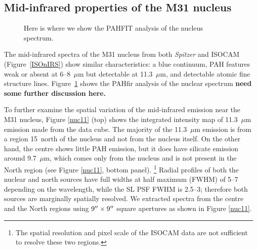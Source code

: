 \subsection{Mid-infrared properties of the M31 nucleus}
\label{sect:nucleus}

\begin{figure}
\centering
\caption{Here is where we show the PAHFIT analysis of the nucleus spectrum.}
\label{fig:nuc_pahfit}
\end{figure}

The mid-infrared spectra of the M31 nucleus from both {\em Spitzer} and ISOCAM (Figure~\ref{ISOnIRS}) show similar characteristics: a blue
continuum, PAH features weak or absent at 6--8~$\mu$m  but detectable at 11.3~$\mu$m, and detectable atomic fine structure lines.
Figure~\ref{fig:nuc_pahfit} shows the PAHfir analysis of the nuclear spectrum 
 {\bf need some further discussion  here.}


To further examine the spatial variation of the mid-infrared emission near the M31 nucleus,
Figure \ref{nuc11} (top) shows the integrated intensity map of 11.3~$\mu$m emission made from the data cube. 
The majority of the 11.3~$\mu$m  emission is from a region 15\arcsec\ north of the nucleus and not from the nucleus itself. 
On the other hand, the centre shows little PAH emission,  but it does have silicate emission around 9.7~$\mu$m, 
which comes only from the nucleus and is not present in the North region  (see Figure \ref{nuc11}, bottom panel).%
\footnote{The spatial resolution and pixel scale of the ISOCAM data are not sufficient to resolve these two regions.}
Radial profiles of both the nuclear and north sources have full widths at half maximum (FWHM) of 5--7\arcsec
depending on the wavelength, while the SL PSF FWHM is 2.5--3\arcsec; therefore both sources are
marginally spatially resolved.  %
We extracted spectra from the centre and the North regions using  $9\hbox{$^{\prime\prime}$} \times 9\hbox{$^{\prime\prime}$}$ 
square apertures as shown in Figure \ref{nuc11}. 

